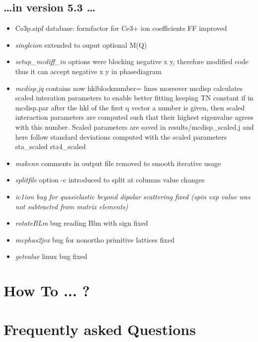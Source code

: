 \documentclass[twoside]{article}
\newcommand{\prg}{\sl}
\begin{document}
\subsection*{ \dots in version 5.3 \dots}
\begin{itemize}
\item  Ce3p.sipf database: formfactor for Ce3+ ion coefficients FF improved 
\item {\prg singleion} extended to ouput optional M(Q)
\item {\prg setup\_mcdiff\_in}  options were blocking negative x y, therefore modified code
           thus it can accept negative x y in phasediagram
\item {\prg mcdisp.jq } contains now hklblocknumber= lines 
 moreover mcdisp calculates scaled interation parameters to enable better fitting keeping TN constant
if in mcdisp.par after the hkl of the first q vector a number is given, then
scaled interaction parameters are computed such that their highest eigenvalue
agrees with this number. Scaled parameters are saved in results/mcdisp\_scaled.j
and here follow standard deviations computed with the scaled parameters
 sta\_scaled sta4\_scaled
\item {\prg makenn} comments in output file removed to smooth iterative usage
\item {\prg splitfile} option -c introduced to split at columns value changes
\item {\prg  ic1ion bug for quasielastic beyond dipolar scattering fixed (spin exp value was not
          subtracted from matrix elements)}
\item {\prg rotateBLm} bug reading Blm with sign  fixed
\item {\prg mcphas2jvx} bug for nonortho primitive lattices fixed
\item {\prg getvalue} linux bug fixed
\end{itemize}

\newpage

\tableofcontents

\clearpage

\section{How To ... ? }


\section{Frequently asked Questions}

\end{document}
